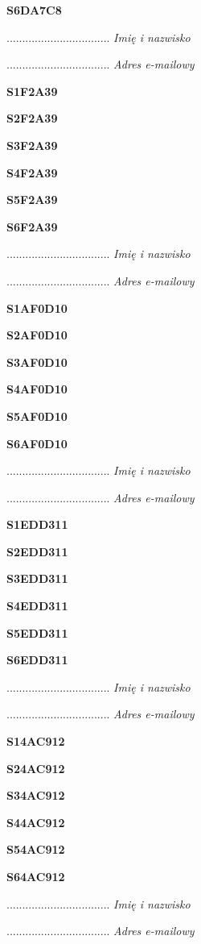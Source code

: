 \Large \textbf{S6DA7C8}

.................................
\textit{Imię i nazwisko}

.................................
\textit{Adres e-mailowy}

\Large \textbf{S1F2A39}

\Large \textbf{S2F2A39}

\Large \textbf{S3F2A39}

\Large \textbf{S4F2A39}

\Large \textbf{S5F2A39}

\Large \textbf{S6F2A39}

.................................
\textit{Imię i nazwisko}

.................................
\textit{Adres e-mailowy}

\Large \textbf{S1AF0D10}

\Large \textbf{S2AF0D10}

\Large \textbf{S3AF0D10}

\Large \textbf{S4AF0D10}

\Large \textbf{S5AF0D10}

\Large \textbf{S6AF0D10}

.................................
\textit{Imię i nazwisko}

.................................
\textit{Adres e-mailowy}

\Large \textbf{S1EDD311}

\Large \textbf{S2EDD311}

\Large \textbf{S3EDD311}

\Large \textbf{S4EDD311}

\Large \textbf{S5EDD311}

\Large \textbf{S6EDD311}

.................................
\textit{Imię i nazwisko}

.................................
\textit{Adres e-mailowy}

\Large \textbf{S14AC912}

\Large \textbf{S24AC912}

\Large \textbf{S34AC912}

\Large \textbf{S44AC912}

\Large \textbf{S54AC912}

\Large \textbf{S64AC912}

.................................
\textit{Imię i nazwisko}

.................................
\textit{Adres e-mailowy}

